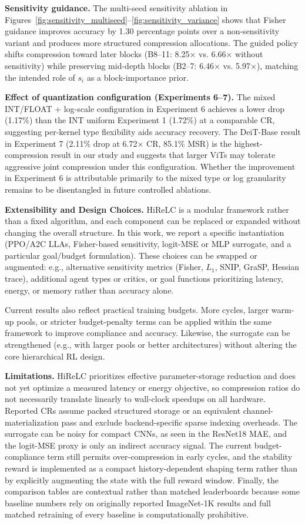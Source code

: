 \documentclass[preprint,12pt,authoryear]{elsarticle}
\begin{document}
\textbf{Sensitivity guidance.} The multi-seed sensitivity ablation in Figures~\ref{fig:sensitivity_multiseed}--\ref{fig:sensitivity_variance} shows that Fisher guidance improves accuracy by 1.30 percentage points over a non-sensitivity variant and produces more structured compression allocations. The guided policy shifts compression toward later blocks (B8--11: 8.25$\times$ vs. 6.66$\times$ without sensitivity) while preserving mid-depth blocks (B2--7: 6.46$\times$ vs. 5.97$\times$), matching the intended role of $s_i$ as a block-importance prior.

\textbf{Effect of quantization configuration (Experiments 6--7).} The mixed INT/FLOAT + log-scale configuration in Experiment 6 achieves a lower drop (1.17\%) than the INT uniform Experiment 1 (1.72\%) at a comparable CR, suggesting per-kernel type flexibility aids accuracy recovery. The DeiT-Base result in Experiment 7 (2.11\% drop at 6.72$\times$ CR, 85.1\% MSR) is the highest-compression result in our study and suggests that larger ViTs may tolerate aggressive joint compression under this configuration. Whether the improvement in Experiment 6 is attributable primarily to the mixed type or log granularity remains to be disentangled in future controlled ablations.

\textbf{Extensibility and Design Choices.} HiReLC is a modular framework rather than a fixed algorithm, and each component can be
replaced or expanded without changing the overall structure. In this work, we report a
specific instantiation (PPO/A2C LLAs, Fisher-based sensitivity, logit-MSE or MLP
surrogate, and a particular goal/budget formulation). These choices can be swapped or
augmented: e.g., alternative sensitivity metrics (Fisher, $L_1$, SNIP, GraSP, Hessian
trace), additional agent types or critics, or goal functions prioritizing latency,
energy, or memory rather than accuracy alone.

Current results also reflect practical training budgets. More cycles, larger warm-up
pools, or stricter budget-penalty terms can be applied within the same framework to
improve compliance and accuracy. Likewise, the surrogate can be strengthened (e.g., with
larger pools or better architectures) without altering the core hierarchical RL design.

\textbf{Limitations.} HiReLC prioritizes effective parameter-storage reduction and does not yet optimize a
measured latency or energy objective, so compression ratios do not necessarily translate
linearly to wall-clock speedups on all hardware. Reported CRs assume packed structured
storage or an equivalent channel-materialization pass and exclude backend-specific sparse
indexing overheads. The surrogate can be noisy for compact
CNNs, as seen in the ResNet18 MAE, and the logit-MSE proxy is only an indirect accuracy
signal. The current budget-compliance term still permits over-compression in early
cycles, and the stability reward is implemented as a compact history-dependent shaping
term rather than by explicitly augmenting the state with the full reward window. Finally,
the comparison tables are contextual rather than matched leaderboards because some baseline
numbers rely on originally reported ImageNet-1K results and full matched retraining of
every baseline is computationally prohibitive.
\end{document}
